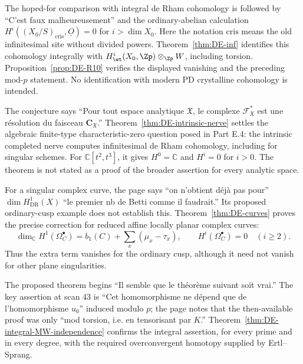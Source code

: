 \begin{remark}\label{rem:DE-quote-E3}
The hoped-for comparison with integral de Rham cohomology is followed by ``C'est faux malheureusement'' and the ordinary-abelian calculation
$H^i((X_0/S)_{\mathrm{cris}},\underline O)=0$ for $i>\dim X_0$.  Here the notation $\mathrm{cris}$ means the old infinitesimal site without divided powers.  Theorem~\ref{thm:DE-inf} identifies this cohomology integrally with $H^i_{\et}(X_0,\Zp)\otimes_{\Zp}W$, including torsion.  Proposition~\ref{prop:DE-R10} verifies the displayed vanishing and the preceding mod-$p$ statement.  No identification with modern PD crystalline cohomology is intended.
\end{remark}

\begin{remark}\label{rem:DE-quote-E4}
The conjecture says ``Pour tout espace analytique $\mathfrak X$, le complexe $\mathcal F_{\mathfrak X}^*$ est une résolution du faisceau $\mathbf C_{\mathfrak X}$.''  Theorem~\ref{thm:DE-intrinsic-nerve} settles the algebraic finite-type characteristic-zero question posed in Part E.4: the intrinsic completed nerve computes infinitesimal de Rham cohomology, including for singular schemes.  For $\mathbb C[t^2,t^3]$, it gives $H^0=\mathbb C$ and $H^i=0$ for $i>0$.  The theorem is not stated as a proof of the broader assertion for every analytic space.
\end{remark}

\begin{remark}\label{rem:DE-quote-E5}
For a singular complex curve, the page says ``on n'obtient déjà pas pour'' $\dim H^1_{\mathrm{DR}}(X)$ ``le premier nb de Betti comme il faudrait.''  Its proposed ordinary-cusp example does not establish this.  Theorem~\ref{thm:DE-curves} proves the precise correction for reduced affine locally planar complex curves:
\[
 \dim_{\mathbb C}H^1(\Omega_C^\bullet)
 =b_1(C)+\sum_x(\mu_x-\tau_x),\qquad
 H^i(\Omega_C^\bullet)=0\quad(i\geq2).
\]
Thus the extra term vanishes for the ordinary cusp, although it need not vanish for other plane singularities.
\end{remark}

\begin{remark}\label{rem:DE-quote-E6}
The proposed theorem begins ``Il semble que le théorème suivant soit vrai.''  The key assertion at scan 43 is ``Cet homomorphisme ne dépend que de l'homomorphisme $u_0$'' induced modulo $p$; the page notes that the then-available proof was only ``mod torsion, i.e. en tensorisant par $K$.''  Theorem~\ref{thm:DE-integral-MW-independence} confirms the integral assertion, for every prime and in every degree, with the required overconvergent homotopy supplied by Ertl--Sprang.
\end{remark}

